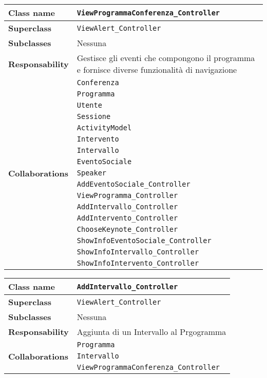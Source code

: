 \begin{table}[h!]
	\begin{tabular}{|l|l|}
		\hline 
		\textbf{Class name} & \texttt{ViewProgrammaConferenza\_Controller}
		\\ \hline
		\textbf{Superclass} & \texttt{ViewAlert\_Controller}
		\\ \hline
		\multirow{1}{*}{\textbf{Subclasses}} & Nessuna
		\\ \hline
		\textbf{Responsability} & Gestisce gli eventi che compongono il programma e fornisce diverse funzionalità di navigazione
		\\ \hline
		\multirow{17}{*}{\textbf{Collaborations}} & \texttt{Conferenza} \\
		& \texttt{Programma}\\
		& \texttt{Utente}\\
		& \texttt{Sessione}\\
		& \texttt{ActivityModel}\\
		& \texttt{Intervento} \\
		& \texttt{Intervallo} \\
		& \texttt{EventoSociale} \\
		& \texttt{Speaker} \\
		& \texttt{AddEventoSociale\_Controller} \\
		& \texttt{ViewProgramma\_Controller} \\
		& \texttt{AddIntervallo\_Controller} \\
		& \texttt{AddIntervento\_Controller} \\
		& \texttt{ChooseKeynote\_Controller} \\
		& \texttt{ShowInfoEventoSociale\_Controller} \\
		& \texttt{ShowInfoIntervallo\_Controller} \\
		& \texttt{ShowInfoIntervento\_Controller} \\ \hline
	\end{tabular}
\end{table}


\begin{table}[h!]
	\begin{tabular}{|l|l|}
		\hline 
		\textbf{Class name} & \texttt{AddIntervallo\_Controller}
		\\ \hline
		\textbf{Superclass} & \texttt{ViewAlert\_Controller}
		\\ \hline
		\multirow{1}{*}{\textbf{Subclasses}} & Nessuna
		\\ \hline
		\textbf{Responsability} & Aggiunta di un Intervallo al Prgogramma
		\\ \hline
		\multirow{3}{*}{\textbf{Collaborations}} & \texttt{Programma }\\
		& \texttt{Intervallo}\\
		& \texttt{ViewProgrammaConferenza\_Controller}
		\\ \hline
	\end{tabular}
\end{table}

